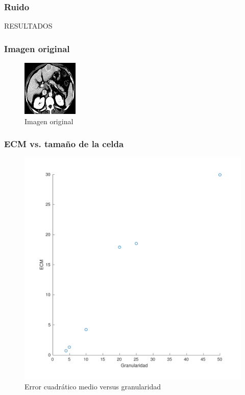 \documentclass[11pt]{beamer}
\begin{document}
\begin{frame}
\frametitle{Ruido}
\end{frame}


\begin{frame}{RESULTADOS}
    \frametitle{Imagen original}
    \begin{figure}
    \centering
            \includegraphics[scale=1]{img/tomo.png}
            \caption{Imagen original}
            \label{fig:original}
    \end{figure}
\end{frame}
    

\begin{frame}
\frametitle{ECM vs. tamaño de la celda}
\begin{figure}
\centering
        \includegraphics[scale=0.4]{img/granu_ecm-eps-converted-to.pdf}
        \caption{Error cuadrático medio versus granularidad}
        \label{fig:ECM vs granularidad}
\end{figure}
\end{frame}
\end{document}
